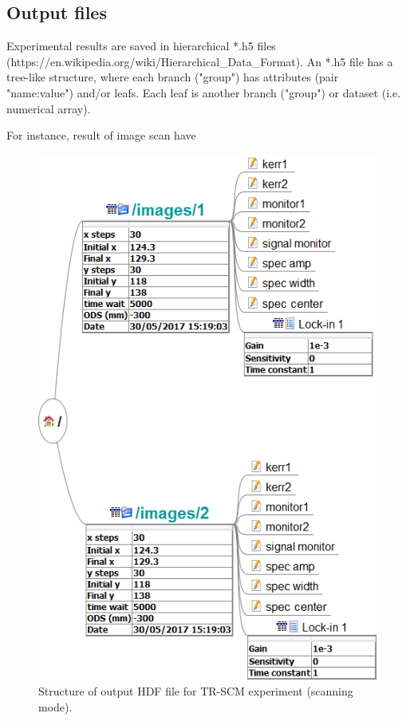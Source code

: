 \documentclass[14pt,a4paper] {article}
\begin{document}
\subsection{Output files}

Experimental results are saved in hierarchical *.h5 files (https://en.wikipedia.org/wiki/Hierarchical_Data_Format). An *.h5 file has a tree-like structure, where each branch ("group") has attributes (pair "name:value") and/or leafs. Each leaf is another branch ("group") or dataset (i.e. numerical array).

For instance, result of image scan have
\begin{figure}
\includegraphics[width = 0.8\linewidth]{HDF5-format.png}
\caption{Structure of output HDF file for TR-SCM experiment (scanning mode).}
\end{figure}
  
\end{document}
